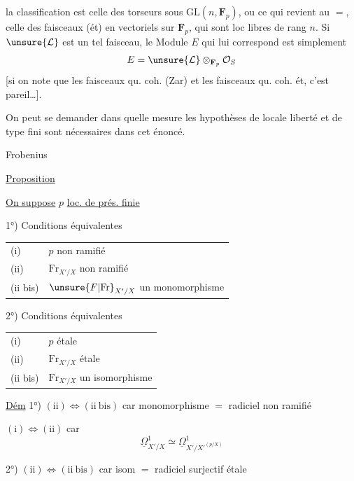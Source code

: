 la classification est celle des torseurs sous
$\mathrm{GL}(n,\mathbf F_p)$, ou ce qui revient au $=$, celle des
faisceaux (ét) en  vectoriels sur $\mathbf F_p$, qui
sont loc libres de rang $n$. Si $\unsure{\mathcal L}$ est un
tel faisceau, le Module $E$ qui lui
correspond est simplement
\[
E=\unsure{\mathcal L}\otimes_{\mathbf F_p}\mathcal O_S
\]
[si on note que les faisceaux qu. coh.
(Zar) et les faisceaux qu. coh. ét,
c'est pareil\ldots].

On peut se demander dans quelle mesure les
hypothèses de locale liberté et de type fini sont
nécessaires dans cet énoncé.

Frobenius



\uline{Proposition}

\uline{On suppose} $p$ \uline{loc. de prés. finie}

1°) Conditions équivalentes

\begin{tabular}{ll}
(i) & $p$ non ramifié\\
(ii) & $\mathrm{Fr}_{X'/X}$ non ramifié\\
(ii bis) & $\unsure{F|\mathrm{Fr}}_{X'/X}$ un monomorphisme
\end{tabular}

2°) Conditions équivalentes

\begin{tabular}{ll}
(i) & $p$ étale\\
(ii) & $\mathrm{Fr}_{X'/X}$ étale\\
(ii bis) & $\mathrm{Fr}_{X'/X}$ un isomorphisme
\end{tabular}

\uline{Dém} 1°) $(\mathrm{ii})\Longleftrightarrow(\mathrm{ii\ bis})$ car monomorphisme $=$ radiciel non ramifié

$(\mathrm{i})\Longleftrightarrow(\mathrm{ii})$ car
\[
\underline\Omega^1_{X'/X}\simeq\underline\Omega^1_{X'/X'^{(p/X)}}
\]

 2°) $(\mathrm{ii})\Longleftrightarrow(\mathrm{ii\ bis})$ car isom $=$ radiciel surjectif étale

